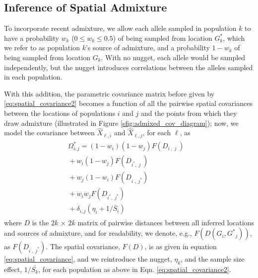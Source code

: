 \documentclass[12pt]{article}
\newcommand{\kadmixsource}[1]{{$G^{*}_{#1}$}}
\newcommand{\identifyadmixsource}[1]{{#1^{*}}}
\begin{document}
\subsection*{Inference of Spatial Admixture}

To incorporate recent admixture, 
we allow each allele sampled in population $k$ to have a probability $w_k$ ($0 \leq w_k \leq 0.5$) of being sampled from location \kadmixsource{k},
which we refer to as population $k$'s source of admixture,
and a probability $1-w_k$ of being sampled from location $G_k$.
With no nugget, each allele would be sampled independently, but the nugget introduces correlations between the alleles sampled in each population.

With this addition, the parametric covariance matrix before given by \eqref{eq:spatial_covariance2}
becomes a function of all the pairwise spatial covariances between the locations of populations $i$ and $j$ and the points from which they draw admixture 
(illustrated in Figure \ref{sfig:admixed_cov_diagram});
now, we model the covariance between $\hat X_{\ell,i}$ and $\hat X_{\ell,j}$, for each $\ell$, as
\begin{align}
\label{eq:admixed_covariance_1}\begin{split}
\identifyadmixsource{\Omega_{i,j}} = 
  (1-w_i)(1-w_j) F(D_{i\;,\;j\;}) &\\
  {} + w_i(1-w_j) F(D_{\identifyadmixsource{i},\;j\;})    &\\
  {} + w_j(1-w_i) F(D_{i\;,\;\identifyadmixsource{j}})    &\\
  {} + w_i w_j F(D_{\identifyadmixsource{i},\;\identifyadmixsource{j}})    &\\
  {} + \delta_{i,j} (\eta_i + 1 / \bar{S}_i) &
\end{split}
\end{align}
where $D$ is the $2k \, \times \, 2k$ matrix of pairwise distances between all inferred locations and sources of admixture, 
and for readability, we denote, e.g., $F(D(G_i,\identifyadmixsource{G}_j))$, as $F(D_{i\;,\;\identifyadmixsource{j}})$.
The spatial covariance, $F(D)$, is as given in equation \eqref{eq:spatial_covariance}, and we reintroduce the nugget, $\eta_k$, and the sample size effect, $1/\bar{S_k}$, for each population as above in Eqn. \eqref{eq:spatial_covariance2}.
\end{document}
